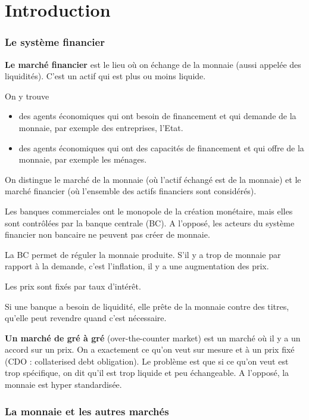 \part{Introduction}

\section{Le système financier}
\textbf{Le marché financier} est le lieu où on échange de la monnaie (aussi appelée des liquidités). C'est un actif qui est plus ou moins liquide.

On y trouve

\begin{itemize}
	\item des agents économiques qui ont besoin de financement et qui demande de la monnaie, par exemple des entreprises, l'Etat.
	\item des agents économiques qui ont des capacités de financement et qui offre de la monnaie, par exemple les ménages.
\end{itemize}

On distingue le marché de la monnaie (où l'actif échangé est de la monnaie) et le marché financier (où l'ensemble des actifs financiers sont considérés).


Les banques commerciales ont le monopole de la création monétaire, mais elles sont contrôlées par la banque centrale (BC). A l'opposé, les acteurs du système financier non bancaire ne peuvent pas créer de monnaie.

La BC permet de réguler la monnaie produite. S'il y a trop de monnaie par rapport à la demande, c'est l'inflation, il y a une augmentation des prix.

Les prix sont fixés par taux d'intérêt.

Si une banque a besoin de liquidité, elle prête de la monnaie contre des titres, qu'elle peut revendre quand c'est nécessaire.

\textbf{Un marché de gré à gré} (over-the-counter market) est un marché où il y a un accord sur un prix. On a exactement ce qu'on veut sur mesure et à un prix fixé (CDO : collaterised debt obligation). Le problème est que si ce qu'on veut est trop spécifique, on dit qu'il est trop liquide et peu échangeable. A l'opposé, la monnaie est hyper standardisée.

\section{La monnaie et les autres marchés}


